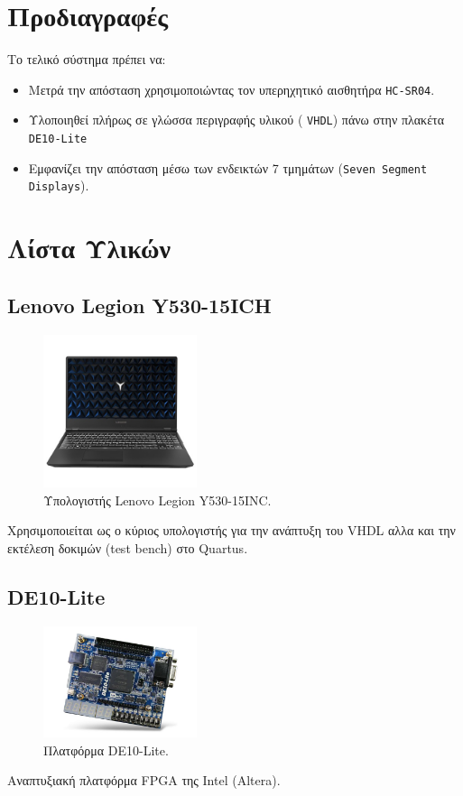 \documentclass[conference]{IEEEtran}
\begin{document}
\section{Προδιαγραφές}
Το τελικό σύστημα πρέπει να:
\begin{itemize}
    \item Μετρά την απόσταση χρησιμοποιώντας τον υπερηχητικό αισθητήρα  \texttt{HC-SR04}.
    \item Υλοποιηθεί πλήρως σε γλώσσα περιγραφής υλικού ( \texttt{VHDL}) πάνω στην πλακέτα  \texttt{DE10-Lite}
    \item Εμφανίζει την απόσταση μέσω των ενδεικτών 7 τμημάτων (\texttt{Seven Segment Displays}).
\end{itemize}

\section{Λίστα Υλικών}
\subsection{Lenovo Legion Y530-15ICH}
\begin{figure}[H]
	\centerline{\includegraphics[width=0.4\textwidth]{assets/legion.jpg}}
	\caption{Υπολογιστής Lenovo Legion Y530-15INC.}
\end{figure}
Χρησιμοποιείται ως ο κύριος υπολογιστής για την ανάπτυξη του VHDL αλλα και την εκτέλεση δοκιμών (test bench) στο Quartus.

\subsection{DE10-Lite}
\begin{figure}[H]
	\centerline{\includegraphics[width=0.4\textwidth]{assets/de10lite.jpeg}}
	\caption{Πλατφόρμα DE10-Lite.}
\end{figure}
Αναπτυξιακή πλατφόρμα FPGA της Intel (Altera).
\end{document}
